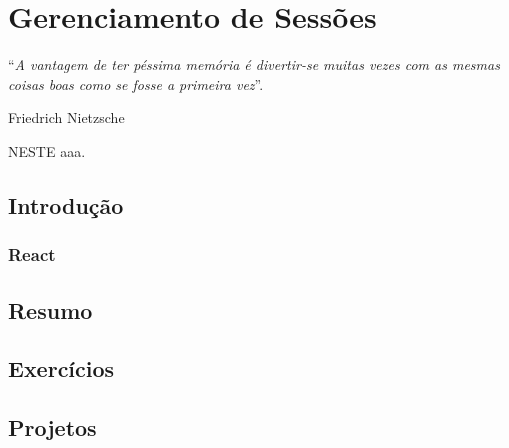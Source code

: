 \chapter{Gerenciamento de Sessões}\label{cap:gerenciamentoSessoes}
\epigraph{``\textit{A vantagem de ter péssima memória é divertir-se muitas vezes com as mesmas coisas boas como se fosse a primeira vez}''.}{Friedrich Nietzsche}

\lettrine[lines=4, lhang=0.1, lraise=0, loversize=0.2, findent=0.1em]{\textcolor{corTema}{N}}{ESTE} aaa.

\vfill

\section{Introdução}



\subsection{React}

\section{Resumo}

\section{Exercícios}

\section{Projetos}